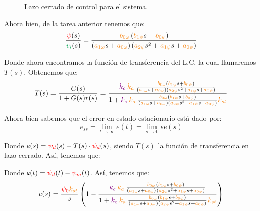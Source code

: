 \begin{figure}[h]
  \caption{Lazo cerrado de control para el sistema.}\label{fig:diag-lc}
\end{figure}


Ahora bien, de la tarea anterior tenemos que:
\begin{equation}
  \frac{\rojo{\psi}(s)}{\verd{v_i}(s)} =
  \frac{\nara{\nara{b_{0\omega}}}\left(\nara{b_{1\psi}}s + \nara{b_{0\psi}}\right)}
  {\left(\nara{a_{1\omega}}s + \nara{a_{0\omega}}\right)\left(\nara{a_{2\psi}}s^{2} + \nara{a_{1\psi}}s + \nara{a_{0\psi}}\right)}
\end{equation}

Donde ahora encontramos la función de transferencia del L.C, la cual llamaremos
\(T(s)\). Obtenemos que:
\begin{equation}
  T(s) = \frac{G(s)}{1 + G(s)r(s)} = \dfrac{\mora{k_c}\nara{k_a} \frac{\nara{\nara{b_{0\omega}}}\left(\nara{b_{1\psi}}s + \nara{b_{0\psi}}\right)}
  {\left(\nara{a_{1\omega}}s + \nara{a_{0\omega}}\right)\left(\nara{a_{2\psi}}s^{2} + \nara{a_{1\psi}}s + \nara{a_{0\psi}}\right)}}{1+\mora{k_c}\nara{k_a} \frac{\nara{\nara{b_{0\omega}}}\left(\nara{b_{1\psi}}s + \nara{b_{0\psi}}\right)}
  {\left(\nara{a_{1\omega}}s + \nara{a_{0\omega}}\right)\left(\nara{a_{2\psi}}s^{2} + \nara{a_{1\psi}}s + \nara{a_{0\psi}}\right)}\nara{k_{st}}}
\end{equation}


Ahora bien sabemos que el error en estado estacionario está dado por:
\begin{equation}
  e_{ss} = \lim_{t \to \infty} e(t) = \lim_{s \to 0} s e(s)
\end{equation}


Donde \( e(s) = \mathbin{\color{red}\psi_d}(s) - T(s) \cdot \mathbin{\color{red}\psi_d}(s) \), siendo \( T(s) \) la función de transferencia en lazo cerrado. Así, tenemos que:

Donde \( e(t) = \mathbin{\color{red}\psi_{d}}(t) - \mathbin{\color{red}\psi_{m}}(t) \). Así, tenemos que:
\begin{equation}
  e(s) = \frac{\rojo{\psi_0}\nara{k_{st}}}{s} \left( 1 - \dfrac{\mora{k_c}\nara{k_a} \frac{\nara{\nara{b_{0\omega}}}\left(\nara{b_{1\psi}}s + \nara{b_{0\psi}}\right)}
  {\left(\nara{a_{1\omega}}s + \nara{a_{0\omega}}\right)\left(\nara{a_{2\psi}}s^{2} + \nara{a_{1\psi}}s + \nara{a_{0\psi}}\right)}}{1+\mora{k_c}\nara{k_a} \frac{\nara{\nara{b_{0\omega}}}\left(\nara{b_{1\psi}}s + \nara{b_{0\psi}}\right)}
{\left(\nara{a_{1\omega}}s + \nara{a_{0\omega}}\right)\left(\nara{a_{2\psi}}s^{2} + \nara{a_{1\psi}}s + \nara{a_{0\psi}}\right)}\nara{k_{st}}} \right)
\end{equation}



